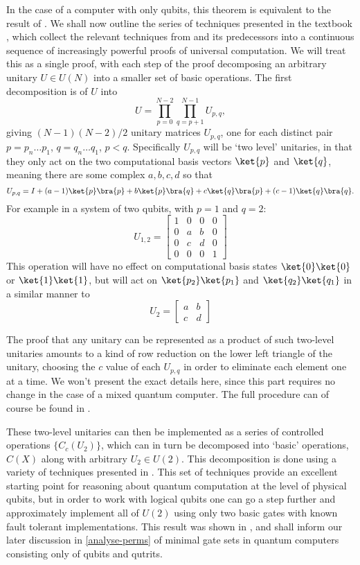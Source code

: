 In the case of a computer with only qubits, this theorem is equivalent to the result of \cite{cnot-decomposition}. We shall now outline the series of techniques presented in the textbook \cite{textbook}, which collect the relevant techniques from \cite{cnot-decomposition} and its predecessors into a continuous sequence of increasingly powerful proofs of universal computation. We will treat this as a single proof, with each step of the proof decomposing an arbitrary unitary $U \in U(N)$ into a smaller set of basic operations. The first decomposition is of $U$ into
\[U = \prod_{p=0}^{N-2}\prod_{q=p+1}^{N-1}U_{p,q},\]
giving $(N-1)(N-2)/2$ unitary matrices $U_{p,q}$, one for each distinct pair $p = p_n\dots p_1$, $q = q_n\dots q_1$, $p < q$. Specifically $U_{p,q}$ will be `two level' unitaries, in that they only act on the two computational basis vectors $\ket{p}$ and $\ket{q}$, meaning there are some complex $a, b, c, d$ so that
\[U_{p,q} = I + (a-1)\ket{p}\bra{p} + b\ket{p}\bra{q}+ c\ket{q}\bra{p}+ (c-1)\ket{q}\bra{q}.\]
For example in a system of two qubits, with $p = 1$ and $q = 2$:
\[U_{1,2} = \begin{bmatrix}
1 & 0 & 0 & 0 \\
0 & a & b & 0 \\
0 & c & d & 0 \\
0 & 0 & 0 & 1
\end{bmatrix}\]
This operation will have no effect on computational basis states $\ket{0}\ket{0}$ or $\ket{1}\ket{1}$, but will act on $\ket{p_2}\ket{p_1}$ and $\ket{q_2}\ket{q_1}$ in a similar manner to
\[U_2 = \begin{bmatrix}
a & b \\
c & d
\end{bmatrix}\]

The proof that any unitary can be represented as a product of such two-level unitaries amounts to a kind of row reduction on the lower left triangle of the unitary, choosing the $c$ value of each $U_{p,q}$ in order to eliminate each element one at a time. We won't present the exact details here, since this part requires no change in the case of a mixed quantum computer. The full procedure can of course be found in \cite{textbook}.

These two-level unitaries can then be implemented as a series of controlled operations $\{C_c(U_2)\}$, which can in turn be decomposed into `basic' operations, $C(X)$ along with arbitrary $U_2 \in U(2)$. This decomposition is done using a variety of techniques presented in \cite{cnot-decomposition}. This set of techniques provide an excellent starting point for reasoning about quantum computation at the level of physical qubits, but in order to work with logical qubits one can go a step further and approximately implement all of $U(2)$ using only two basic gates with known fault tolerant implementations. This result was shown in \cite{universal-qubit}, and shall inform our later discussion in \autoref{analyse-perms} of minimal gate sets in quantum computers consisting only of qubits and qutrits.

